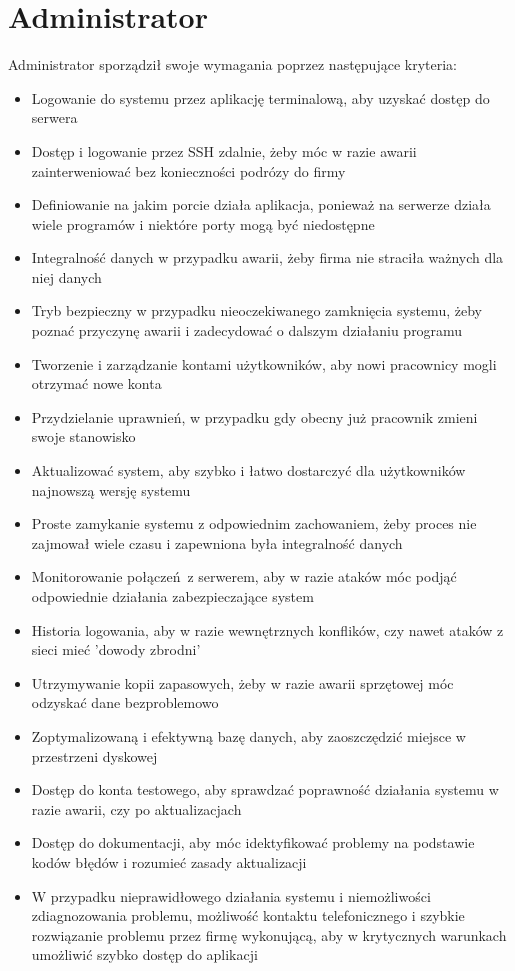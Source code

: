\documentclass{article}
\begin{document}
\newpage
\section{Administrator}
Administrator sporządził swoje wymagania poprzez następujące kryteria:
\begin{itemize}
    \item Logowanie do systemu przez aplikację terminalową, aby uzyskać dostęp do serwera
    \item Dostęp i logowanie przez SSH zdalnie, żeby móc w razie awarii zainterweniować bez konieczności podrózy do firmy
    \item Definiowanie na jakim porcie działa aplikacja, ponieważ na serwerze działa wiele programów i niektóre porty mogą być niedostępne
    \item Integralność danych w przypadku awarii, żeby firma nie straciła ważnych dla niej danych
    \item Tryb bezpieczny w przypadku nieoczekiwanego zamknięcia systemu, żeby poznać przyczynę awarii i zadecydować o dalszym działaniu programu
    \item Tworzenie i zarządzanie kontami użytkowników, aby nowi pracownicy mogli otrzymać nowe konta
    \item Przydzielanie uprawnień, w przypadku gdy obecny już pracownik zmieni swoje stanowisko
    \item Aktualizować system, aby szybko i łatwo dostarczyć dla użytkowników najnowszą wersję systemu
    \item Proste zamykanie systemu z odpowiednim zachowaniem, żeby proces nie zajmował wiele czasu i zapewniona była integralność danych
    \item Monitorowanie połączeń z serwerem, aby w razie ataków móc podjąć odpowiednie działania zabezpieczające system
    \item Historia logowania, aby w razie wewnętrznych konflików, czy nawet ataków z sieci mieć 'dowody zbrodni'
    \item Utrzymywanie kopii zapasowych, żeby w razie awarii sprzętowej móc odzyskać dane bezproblemowo
    \item Zoptymalizowaną i efektywną bazę danych, aby zaoszczędzić miejsce w przestrzeni dyskowej
    \item Dostęp do konta testowego, aby sprawdzać poprawność działania systemu w razie awarii, czy po aktualizacjach
    \item Dostęp do dokumentacji, aby móc idektyfikować problemy na podstawie kodów błędów i rozumieć zasady aktualizacji
    \item W przypadku nieprawidłowego działania systemu i niemożliwości zdiagnozowania problemu, możliwość kontaktu telefonicznego i szybkie rozwiązanie problemu przez firmę wykonującą, aby w krytycznych warunkach umożliwić szybko dostęp do aplikacji
\end{itemize}
\end{document}
